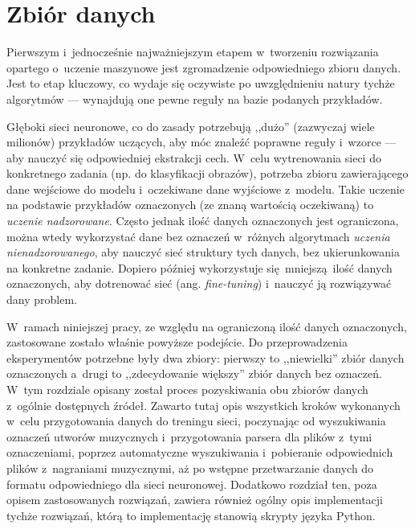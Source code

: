 \chapter{Zbiór danych} \label{chapter:dataset}


Pierwszym i~jednocześnie najważniejszym etapem w~tworzeniu rozwiązania opartego o~uczenie maszynowe jest zgromadzenie odpowiedniego zbioru danych. Jest to etap kluczowy, co wydaje się oczywiste po uwzględnieniu natury tychże algorytmów --- wynajdują one pewne reguły na bazie podanych przykładów.

Głęboki sieci neuronowe, co do zasady potrzebują ,,dużo'' (zazwyczaj wiele milionów) przykładów uczących, aby móc znaleźć poprawne reguły i~wzorce --- aby nauczyć się odpowiedniej ekstrakcji cech. W~celu wytrenowania sieci do konkretnego zadania (np. do klasyfikacji obrazów), potrzeba zbioru zawierającego dane wejściowe do modelu i~oczekiwane dane wyjściowe z~modelu. Takie uczenie na podstawie przykładów oznaczonych (ze znaną wartością oczekiwaną) to \emph{uczenie nadzorowane}. Często jednak ilość danych oznaczonych jest ograniczona, można wtedy wykorzystać dane bez oznaczeń w~różnych algorytmach \emph{uczenia nienadzorowanego}, aby nauczyć sieć struktury tych danych, bez ukierunkowania na konkretne zadanie. Dopiero później wykorzystuje się mniejszą ilość danych oznaczonych, aby dotrenować sieć (ang. \emph{fine-tuning}) i~nauczyć ją rozwiązywać dany problem.

W~ramach niniejszej pracy, ze względu na ograniczoną ilość danych oznaczonych, zastosowane zostało właśnie powyższe podejście. Do przeprowadzenia eksperymentów potrzebne były dwa zbiory: pierwszy to ,,niewielki'' zbiór danych oznaczonych a~drugi to ,,zdecydowanie większy'' zbiór danych bez oznaczeń. W~tym rozdziale opisany został proces pozyskiwania obu zbiorów danych z~ogólnie dostępnych źródeł. Zawarto tutaj opis wszystkich kroków wykonanych w~celu przygotowania danych do treningu sieci, poczynając od wyszukiwania oznaczeń utworów muzycznych i~przygotowania parsera dla plików z~tymi oznaczeniami, poprzez automatyczne wyszukiwania i~pobieranie odpowiednich plików z~nagraniami muzycznymi, aż po wstępne przetwarzanie danych do formatu odpowiedniego dla sieci neuronowej. Dodatkowo rozdział ten, poza opisem zastosowanych rozwiązań, zawiera również ogólny opis implementacji tychże rozwiązań, którą to implementację stanowią skrypty języka Python.

